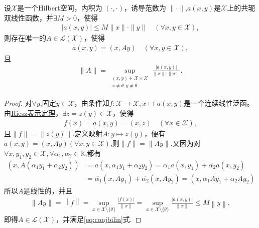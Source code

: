 \documentclass[../../main.tex]{subfiles}%
\begin{document}
\begin{theorem}\label{theorem:泛函分析--定理2.2.2}
设$\mathscr{X}$是一个Hilbert空间，内积为 $(\cdot,\cdot)$，诱导范数为 $\|\cdot\|$,$a(x,y)$是$\mathscr{X}$上的共轭双线性函数，并$\exists M>0$，使得
\begin{align*}
|a(x,y)|\leqslant M\|x\|\cdot\|y\|\quad (\forall x,y\in\mathscr{X}),
\end{align*}
则存在唯一的$A\in\mathscr{L}(\mathscr{X})$，使得
\begin{align*}
a(x,y)=(x,Ay)\quad (\forall x,y\in\mathscr{X}),
\end{align*}
且
\begin{align}
\|A\|=\sup_{\substack{(x,y)\in\mathscr{X}\times\mathscr{X} \\ x\neq\theta,y\neq\theta}} \frac{|a(x,y)|}{\|x\|\cdot\|y\|}.
\label{eq:conjbilin}
\end{align}
\end{theorem}
\begin{proof}

对$\forall y$,固定$y\in\mathscr{X}$，由条件知$f:\mathscr{X}\to \mathscr{X},x\mapsto a(x,y)$是一个连续线性泛函。由\hyperref[theorem:Riesz表示定理(Hilbert空间)]{Riesz表示定理}，$\exists z=z(y)\in\mathscr{X}$，使得
\begin{align*}
f(x)=a(x,y)=(x,z)\quad (\forall x\in\mathscr{X}),
\end{align*}
且$\|f\|=\|z(y)\|$.定义映射$A:y\mapsto z(y)$，便有$a(x,y)=(x,Ay)(\forall x,y\in\mathscr{X})$,则$\|f\|=\|Ay\|$.又因为对$\forall x,y_1,y_2\in\mathscr{X},\forall\alpha_1,\alpha_2\in\mathbb{K}$,都有
\begin{align*}
(x,A(\alpha_1y_1+\alpha_2y_2))&=a(x,\alpha_1y_1+\alpha_2y_2)
=\overline{\alpha_1}a(x,y_1)+\overline{\alpha_2}a(x,y_2)\\
&=\overline{\alpha_1}(x,Ay_1)+\overline{\alpha_2}(x,Ay_2)
=(x,\alpha_1Ay_1+\alpha_2Ay_2)
\end{align*}
所以$A$是线性的，并且
\begin{align*}
\left\| Ay \right\| =\left\| f \right\| =\mathop {\mathrm{sup}} \limits_{x\in \mathscr{X} \setminus \{\theta \}}\frac{\left| f\left( x \right) \right|}{\left\| x \right\|}=\mathop {\mathrm{sup}} \limits_{x\in \mathscr{X} \setminus \{\theta \}}\frac{\left| a\left( x,y \right) \right|}{\left\| x \right\|}\leqslant M\left\| y \right\| ,
\end{align*}
即得$A\in\mathscr{L}(\mathscr{X})$，并满足\eqref{eq:conjbilin}式.

\end{proof}
\end{document}
